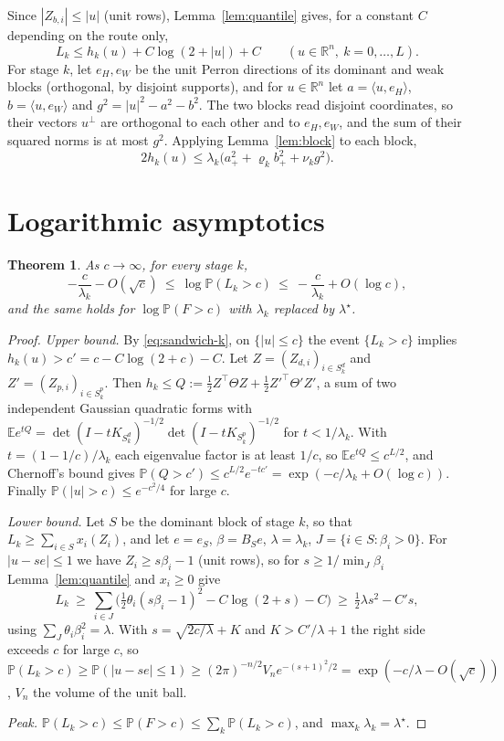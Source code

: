 \documentclass[pdflatex,sn-mathphys-ay]{sn-jnl}%
\theoremstyle{thmstyleone}%
\newtheorem{theorem}{Theorem}
\theoremstyle{thmstylethree}%
\theoremstyle{thmstyletwo}%
\newcommand{\E}{\mathbb{E}}
\renewcommand{\P}{\mathbb{P}}
\newcommand{\R}{\mathbb{R}}
\newcommand{\ip}[2]{\langle #1,#2\rangle}
\begin{document}
Since $|Z_{b,i}|\le|u|$ (unit rows), Lemma~\ref{lem:quantile} gives, for a constant $C$
depending on the route only,
\begin{equation}\label{eq:sandwich-k}
L_k\le h_k(u)+C\log(2+|u|)+C\qquad(u\in\R^n,\ k=0,\dots,L).
\end{equation}
For stage $k$, let $e_H,e_W$ be the unit Perron directions of its dominant and weak
blocks (orthogonal, by disjoint supports), and for $u\in\R^n$ let $a=\ip u{e_H}$,
$b=\ip u{e_W}$ and $g^2=|u|^2-a^2-b^2$. The two blocks read disjoint coordinates, so
their vectors $u^\perp$ are orthogonal to each other and to $e_H,e_W$, and the sum of their
squared norms is at most $g^2$. Applying Lemma~\ref{lem:block} to each block,
\begin{equation}\label{eq:stage-form}
2h_k(u)\le\lambda_k\big(a_+^2+\varrho_k b_+^2+\nu_k g^2\big).
\end{equation}

\section{Logarithmic asymptotics}
\label{sec:ld}

\begin{theorem}\label{thm:ld}
As $c\to\infty$, for every stage $k$,
\[
-\frac{c}{\lambda_k}-O(\sqrt c)\ \le\ \log\P(L_k>c)\ \le\ -\frac{c}{\lambda_k}+O(\log c),
\]
and the same holds for $\log\P(F>c)$ with $\lambda_k$ replaced by $\lambda^\star$.
\end{theorem}

\begin{proof}
\emph{Upper bound.} By \eqref{eq:sandwich-k}, on $\{|u|\le c\}$ the event $\{L_k>c\}$
implies $h_k(u)>c'=c-C\log(2+c)-C$. Let $Z=(Z_{d,i})_{i\in S^d_k}$ and
$Z'=(Z_{p,i})_{i\in S^p_k}$. Then $h_k\le Q:=\frac12Z^\top\Theta Z+\frac12Z'^\top\Theta'Z'$,
a sum of two independent Gaussian quadratic forms with
$\E e^{tQ}=\det(I-tK_{S^d_k})^{-1/2}\det(I-tK_{S^p_k})^{-1/2}$ for $t<1/\lambda_k$. With
$t=(1-1/c)/\lambda_k$ each eigenvalue factor is at least $1/c$, so
$\E e^{tQ}\le c^{L/2}$, and Chernoff's bound gives
$\P(Q>c')\le c^{L/2}e^{-tc'}=\exp(-c/\lambda_k+O(\log c))$. Finally
$\P(|u|>c)\le e^{-c^2/4}$ for large $c$.

\emph{Lower bound.} Let $S$ be the dominant block of stage $k$, so that $L_k\ge
\sum_{i\in S}x_i(Z_i)$, and let $e=e_S$, $\beta=B_Se$, $\lambda=\lambda_k$,
$J=\{i\in S:\beta_i>0\}$. For $|u-se|\le1$ we have $Z_i\ge s\beta_i-1$ (unit rows), so for
$s\ge1/\min_J\beta_i$ Lemma~\ref{lem:quantile} and $x_i\ge0$ give
\[
L_k\ \ge\ \sum_{i\in J}\Big(\tfrac12\theta_i(s\beta_i-1)^2-C\log(2+s)-C\Big)
\ \ge\ \tfrac12\lambda s^2-C's,
\]
using $\sum_J\theta_i\beta_i^2=\lambda$. With $s=\sqrt{2c/\lambda}+K$ and $K>C'/\lambda+1$
the right side exceeds $c$ for large $c$, so
$\P(L_k>c)\ge\P(|u-se|\le1)\ge(2\pi)^{-n/2}V_ne^{-(s+1)^2/2}=\exp(-c/\lambda-O(\sqrt c))$,
$V_n$ the volume of the unit ball.

\emph{Peak.} $\P(L_k>c)\le\P(F>c)\le\sum_k\P(L_k>c)$, and $\max_k\lambda_k=\lambda^\star$.
\end{proof}
\end{document}
